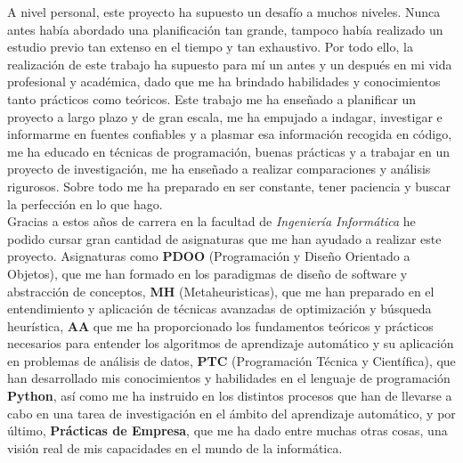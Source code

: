 A nivel personal, este proyecto ha supuesto un desafío a muchos niveles. Nunca antes había abordado una planificación tan grande, tampoco había realizado un estudio previo tan extenso en el tiempo y tan exhaustivo. Por todo ello, la realización de este trabajo ha supuesto para mí un antes y un después en mi vida profesional y académica, dado que me ha brindado habilidades y conocimientos tanto prácticos como teóricos. Este trabajo me ha enseñado a planificar un proyecto a largo plazo y de gran escala, me ha empujado a indagar, investigar e informarme en fuentes confiables y a plasmar esa información recogida en código, me ha educado en técnicas de programación, buenas prácticas y a trabajar en un proyecto de investigación, me ha enseñado a realizar comparaciones y análisis rigurosos. Sobre todo me ha preparado en ser constante, tener paciencia y buscar la perfección en lo que hago.\\[6pt]
Gracias a estos años de carrera en la facultad de \textit{Ingeniería Informática} he podido cursar gran cantidad de asignaturas que me han ayudado a realizar este proyecto. Asignaturas como \textbf{PDOO} (Programación y Diseño Orientado a Objetos), que me han formado en los paradigmas de diseño de software y abstracción de conceptos, \textbf{MH} (Metaheuristicas), que me han preparado en el entendimiento y aplicación de técnicas avanzadas de optimización y búsqueda heurística, \textbf{AA} que me ha proporcionado los fundamentos teóricos y prácticos necesarios para entender los algoritmos de aprendizaje automático y su aplicación en problemas de análisis de datos, \textbf{PTC} (Programación Técnica y Científica), que han desarrollado mis conocimientos y habilidades en el lenguaje de programación \textbf{Python}, así como me ha instruido en los distintos procesos que han de llevarse a cabo en una tarea de investigación en el ámbito del aprendizaje automático, y por último, \textbf{Prácticas de Empresa}, que me ha dado entre muchas otras cosas, una visión real de mis capacidades en el mundo de la informática.